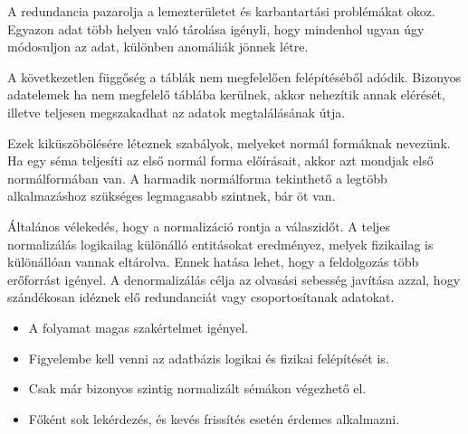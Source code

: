 A redundancia pazarolja a lemezterületet és karbantartási problémákat okoz. Egyazon adat több helyen való tárolása igényli, hogy mindenhol ugyan úgy módosuljon az adat, különben anomáliák jönnek létre.

A következetlen függőség a táblák nem megfelelően felépítéséből adódik. Bizonyos adatelemek ha nem megfelelő táblába kerülnek, akkor nehezítik annak elérését, illetve teljesen megszakadhat az adatok megtalálásának útja.

Ezek kiküszöbölésére léteznek szabályok, melyeket normál formáknak nevezünk. Ha egy séma teljesíti az első normál forma előírásait, akkor azt mondjak első normálformában van. A harmadik normálforma tekinthető a legtöbb alkalmazáshoz szükséges legmagasabb szintnek, bár öt van.

Általános vélekedés, hogy a normalizáció rontja a válaszidőt. A teljes normalizálás logikailag különálló entitásokat eredményez, melyek fizikailag is különállóan vannak eltárolva. Ennek hatása lehet, hogy a feldolgozás több erőforrást igényel.
A denormalizálás célja az olvasási sebesség javítása azzal, hogy szándékosan idéznek elő redundanciát vagy csoportosítanak adatokat.
\begin{itemize}
\item A folyamat magas szakértelmet igényel.
\item Figyelembe kell venni az adatbázis logikai és fizikai felépítését is.
\item Csak már bizonyos szintig normalizált sémákon végezhető el.
\item Főként sok lekérdezés, és kevés frissítés esetén érdemes alkalmazni.
\end{itemize}





